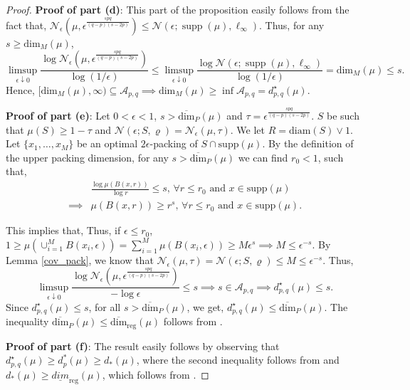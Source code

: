 \documentclass[12pts]{article}
\newcommand{\cN}{ \mathcal{N}}
\newcommand{\sA}{ \mathscr{A}}
\newcommand{\sN}{ \mathscr{N}}
\begin{document}
\begin{proof}
     \textbf{Proof of part (d)}: This part of the proposition easily follows from the fact that, $\sN_{\epsilon}\left(\mu, \epsilon^{\frac{s p q}{(q-p)(s-2p)}}\right) \le \cN(\epsilon; \operatorname{supp}(\mu), \ell_\infty)$. Thus, for any $s \ge \text{dim}_M(\mu)$, 
     \[\limsup_{\epsilon \downarrow 0} \frac{\log \sN_{\epsilon}\left(\mu, \epsilon^{\frac{s p q}{(q-p)(s-2p)}}\right)}{\log(1/\epsilon)}  \le \limsup_{\epsilon \downarrow 0} \frac{\log \cN(\epsilon; \operatorname{supp}(\mu), \ell_\infty) }{\log(1/\epsilon)}  = \text{dim}_M(\mu) \le s.\]
     Hence, $[\text{dim}_M(\mu), \infty) \subseteq \sA_{p,q} \implies \text{dim}_M(\mu) \ge \inf \sA_{p,q} = d^\star_{p,q}(\mu)$.

     \textbf{Proof of part (e)}: Let $0 < \epsilon < 1$, $s > \overline{\text{dim}}_P(\mu)$  
 and $\tau = \epsilon^{\frac{s p q}{(q-p)(s - 2 p)}}$. $S$ be such that $\mu(S) \ge 1- \tau$ and $\cN(\epsilon;S, \varrho) = \sN_\epsilon(\mu, \tau)$. We let $R = \text{diam}(S) \vee 1$. Let $\{x_1, \dots, x_M\}$ be an optimal $2\epsilon$-packing of $S \cap \text{supp}(\mu)$. By the definition of the upper packing dimension, for any $s > \overline{\text{dim}}_{P}(\mu) $ we can find $r_0 < 1$, such that, 
 \begin{align*}
     & \frac{\log \mu(B(x,r))}{\log r} \le s, \, \forall r \le r_0 \text{ and } x \in \text{supp}(\mu) \\
     \implies &  \mu(B(x,r)) \ge r^s, \, \forall r \le r_0 \text{ and } x \in \text{supp}(\mu).
 \end{align*}
 
This implies that, 
Thus, if $\epsilon \le r_0$, \(1 \ge \mu\left(\cup_{i=1}^M B(x_i, \epsilon)\right) = \sum_{i=1}^M \mu\left( B(x_i, \epsilon)\right) \ge M \epsilon^s \implies M \le \epsilon^{-s}.\) By Lemma \ref{cov_pack}, we know that $\sN_\epsilon(\mu, \tau) =\cN(\epsilon; S, \varrho) \le M \le  \epsilon^{-s}$. Thus,
\[ \limsup_{\epsilon \downarrow 0} \frac{ \log \sN_\epsilon\left(\mu, \epsilon^{\frac{s pq}{(q-p)(s-2 p)}}\right)}{-\log \epsilon}  \le s \implies s \in \sA_{p,q} \implies d^\star_{p,q}(\mu) \le s.\]
Since $d^\star_{p,q}(\mu) \le s$, for all $s > \overline{\text{dim}}_P(\mu)$, we get, $d^\star_{p,q}(\mu)  \le \overline{\text{dim}}_P(\mu)$. The inequality $\overline{\text{dim}}_P(\mu) \le \overline{\text{dim}}_{\text{reg}}(\mu)$ follows from \citet[Theorem 2.1]{fraser2017upper}.

\textbf{Proof of part (f)}: The result easily follows by observing that $d^\star_{p,q}(\mu) \ge d^\ast_p(\mu) \ge d_\ast(\mu)$, where the second inequality follows from \citet[Proposition 2]{weed2019sharp} and $d_\ast(\mu) \ge \underline{dim}_{\text{reg}}(\mu)$, which follows from \citet[Proposition 8]{JMLR:v26:24-0054}.
 \end{proof}
 
\end{document}
